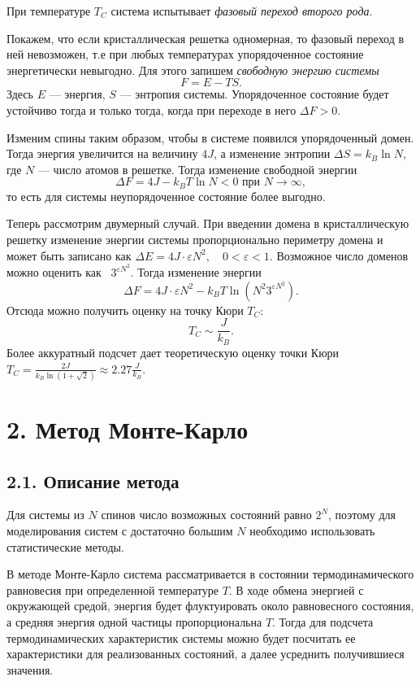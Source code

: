 \documentclass[12pt]{report}
\theoremstyle{definition}
\begin{document}
При температуре $T_C$ система испытывает \emph{фазовый переход второго рода}.

Покажем, что если кристаллическая решетка одномерная, то фазовый переход в ней невозможен, т.е при любых температурах
упорядоченное состояние энергетически невыгодно.
Для этого запишем \emph{свободную энергию системы}
\begin{equation}
    F = E - TS.
\end{equation}
Здесь  $E$ --- энергия, $S$ --- энтропия системы. Упорядоченное состояние будет устойчиво тогда и только тогда, когда
при переходе в него $\Delta F > 0$.

Изменим спины таким образом, чтобы в системе появился упорядоченный домен. Тогда энергия увеличится на величину $4J$, а изменение энтропии
$\Delta S = k_B \ln N$, где $N$ --- число атомов в решетке. Тогда изменение свободной энергии
\begin{equation}
    \Delta F = 4J - k_B T \ln N < 0 \text{ при }N \to \infty,
\end{equation}
то есть для системы неупорядоченное состояние более выгодно.

Теперь рассмотрим двумерный случай. При введении домена в кристаллическую решетку изменение энергии системы пропорционально периметру домена и может быть записано как
$\Delta E = 4J \cdot \varepsilon N^2, \quad 0 < \varepsilon < 1$. Возможное число доменов можно оценить как  $3^{\varepsilon N^2}$. Тогда изменение энергии
\begin{equation}
    \Delta F = 4J \cdot \varepsilon N^2 - k_B T \ln (N^2 3^{\varepsilon N^2}).
\end{equation}
Отсюда можно получить оценку на точку Кюри $T_C$:
\begin{equation}
    T_C \sim \dfrac{J}{k_B}.
\end{equation}
Более аккуратный подсчет дает теоретическую оценку точки Кюри $T_C = \frac{2J}{k_B\ln(1 + \sqrt{2})} \approx 2.27\frac{J}{k_B}.$
\chapter{2. Метод Монте-Карло}
\section{2.1. Описание метода}
Для системы из $N$ спинов число возможных состояний равно $2^N$, поэтому
для моделирования систем с достаточно большим $N$ необходимо использовать статистические методы.

В методе Монте-Карло система рассматривается в состоянии термодинамического равновесия при
определенной температуре $T$. В ходе обмена энергией с окружающей средой, энергия будет
флуктуировать около равновесного состояния, а средняя энергия одной частицы пропорциональна $T$.
Тогда для подсчета термодинамических характеристик системы можно будет посчитать ее характеристики для реализованных состояний,
а далее усреднить получившиеся значения.
\end{document}
